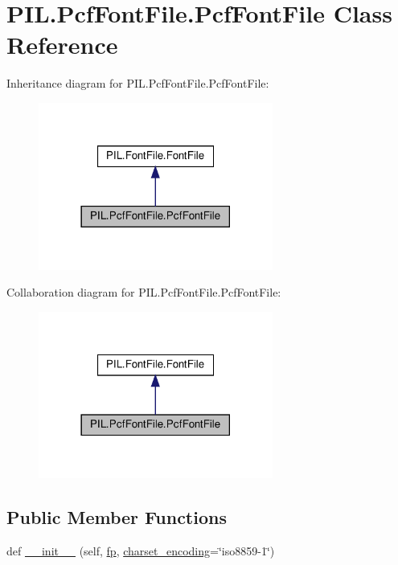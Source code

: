 \hypertarget{classPIL_1_1PcfFontFile_1_1PcfFontFile}{}\section{P\+I\+L.\+Pcf\+Font\+File.\+Pcf\+Font\+File Class Reference}
\label{classPIL_1_1PcfFontFile_1_1PcfFontFile}


Inheritance diagram for P\+I\+L.\+Pcf\+Font\+File.\+Pcf\+Font\+File\+:
\nopagebreak
\begin{figure}[H]
\begin{center}
\leavevmode
\includegraphics[width=218pt]{classPIL_1_1PcfFontFile_1_1PcfFontFile__inherit__graph}
\end{center}
\end{figure}


Collaboration diagram for P\+I\+L.\+Pcf\+Font\+File.\+Pcf\+Font\+File\+:
\nopagebreak
\begin{figure}[H]
\begin{center}
\leavevmode
\includegraphics[width=218pt]{classPIL_1_1PcfFontFile_1_1PcfFontFile__coll__graph}
\end{center}
\end{figure}
\subsection*{Public Member Functions}
\begin{DoxyCompactItemize}
\item 
def \hyperlink{classPIL_1_1PcfFontFile_1_1PcfFontFile_a7db83e0bfc91ca3aec31b38bda8a1daf}{\+\_\+\+\_\+init\+\_\+\+\_\+} (self, \hyperlink{classPIL_1_1PcfFontFile_1_1PcfFontFile_a9b4b5dfc5e8337da6a837fc88e8b9d50}{fp}, \hyperlink{classPIL_1_1PcfFontFile_1_1PcfFontFile_a51b63a7d5912f67b31188865b1e0c3ad}{charset\+\_\+encoding}=\char`\"{}iso8859-\/1\char`\"{})
\end{DoxyCompactItemize}
